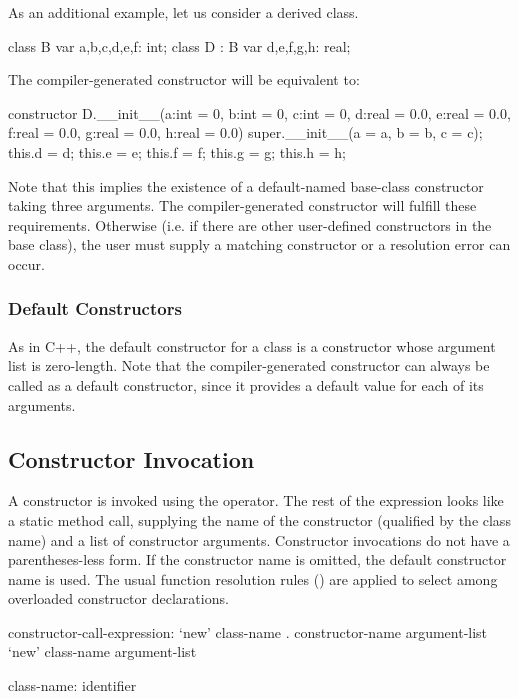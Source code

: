 \begin{example}
As an additional example, let us consider a derived class.
\begin{chapel}
class B {
  var a,b,c,d,e,f: int;
}
class D : B {
  var d,e,f,g,h: real;
}
\end{chapel}
The compiler-generated constructor will be equivalent to:
\begin{chapel}
constructor D.__init__(a:int = 0, b:int = 0, c:int = 0, 
                       d:real = 0.0, e:real = 0.0, f:real = 0.0, 
                       g:real = 0.0, h:real = 0.0)
{ super.__init__(a = a, b = b, c = c);
  this.d = d; this.e = e; this.f = f; this.g = g; this.h = h; }
{}
\end{chapel}
Note that this implies the existence of a default-named base-class constructor
taking three arguments.  The compiler-generated constructor will fulfill these
requirements.  Otherwise (i.e. if there are other user-defined constructors
in the base class), the user must supply a matching constructor or a resolution
error can occur.
\end{example}

\subsubsection{Default Constructors}
\label{Default_Constructors}

As in C++, the default constructor for a class is a constructor whose argument
list is zero-length.  Note that the compiler-generated constructor can always be
called as a default constructor, since it provides a default value for each of
its arguments.

\subsection{Constructor Invocation}
\label{Constructor_Invocation}

A constructor is invoked using the  operator.  The rest of the
expression looks like a static method call, supplying the name of the
constructor (qualified by the class name) and a list of constructor arguments.
Constructor invocations do not have a parentheses-less form.  If the constructor
name is omitted, the default constructor name  is used.  The
usual function resolution rules () are applied to
select among overloaded constructor declarations.

\begin{syntax}
constructor-call-expression:
  `new' class-name . constructor-name argument-list
  `new' class-name argument-list

class-name:
  identifier
\end{syntax}

